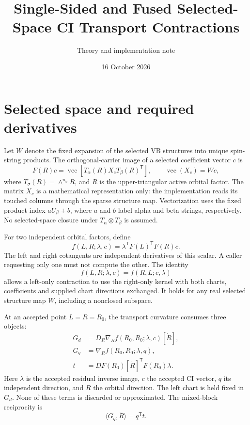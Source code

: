 \documentclass[11pt,a4paper]{article}
\title{Single-Sided and Fused Selected-Space CI Transport Contractions}
\author{Theory and implementation note}
\date{16 October 2026}
\newcommand{\T}{^{\mathsf T}}
\begin{document}
\maketitle

\section{Selected space and required derivatives}

Let $W$ denote the fixed expansion of the selected VB structures into unique
spin-string products. The orthogonal-carrier image of a selected coefficient
vector $c$ is
\begin{equation}
 F(R)c=\operatorname{vec}\left[T_\alpha(R)X_c T_\beta(R)\T\right],
 \qquad \operatorname{vec}(X_c)=Wc,
\end{equation}
where $T_\sigma(R)=\wedge^{n_\sigma}R$, and $R$ is the upper-triangular active
orbital factor. The matrix $X_c$ is a mathematical representation only: the
implementation reads its touched columns through the sparse structure map.
Vectorization uses the fixed product index $aU_\beta+b$, where $a$ and $b$
label alpha and beta strings, respectively.
No selected-space closure under $T_\alpha\otimes T_\beta$ is assumed.

For two independent orbital factors, define
\begin{equation}
 f(L,R;\lambda,c)=\lambda\T F(L)\T F(R)c.
\end{equation}
The left and right cotangents are independent derivatives of this scalar.
A caller requesting only one must not compute the other. The identity
\begin{equation}
 f(L,R;\lambda,c)=f(R,L;c,\lambda)
\end{equation}
allows a left-only contraction to use the right-only kernel with both charts,
coefficients and supplied chart directions exchanged. It holds for any real
selected structure map $W$, including a nonclosed subspace.

At an accepted point $L=R=R_0$, the transport curvature consumes three objects:
\begin{align}
 G_d&=D_R\nabla_R f(R_0,R_0;\lambda,c)[\dot R],\\
 G_q&=\nabla_R f(R_0,R_0;\lambda,q),\\
 t&=DF(R_0)[\dot R]\T F(R_0)\lambda.
\end{align}
Here $\lambda$ is the accepted residual inverse image, $c$ the accepted CI
vector, $q$ its independent direction, and $\dot R$ the orbital direction.
The left chart is held fixed in $G_d$. None of these terms is discarded or
approximated. The mixed-block reciprocity is
\begin{equation}\label{eq:duality}
 \langle G_q,\dot R\rangle=q\T t.
\end{equation}
\end{document}

